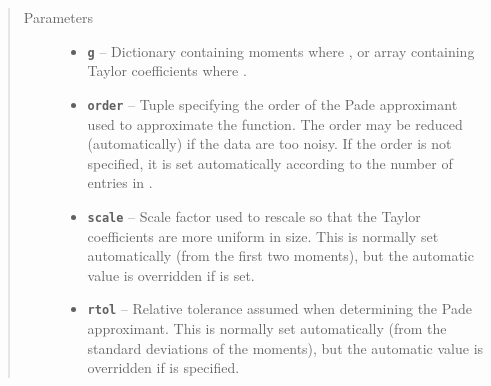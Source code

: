 \documentclass[letterpaper,10pt,english]{sphinxmanual}
\begin{document}
\begin{fulllineitems}
\begin{itemize}
\begin{description}
\end{description}

\end{itemize}
\begin{quote}\begin{description}
\item[{Parameters}] \leavevmode\begin{itemize}
\item {} 
\textbf{\texttt{g}} -- Dictionary containing moments where ,
or array containing Taylor coefficients where
.

\item {} 
\textbf{\texttt{order}} -- Tuple  specifying the order of the Pade
approximant used to approximate the function. The order may
be reduced (automatically) if the data are too noisy.
If the order is not specified, it is set automatically
according to the number of entries in .

\item {} 
\textbf{\texttt{scale}} -- Scale factor used to rescale  so that
the Taylor coefficients are more uniform in size. This is
normally set automatically (from the first two moments),
but the automatic value is overridden if  is set.

\item {} 
\textbf{\texttt{rtol}} -- Relative tolerance assumed when determining the
Pade approximant. This is normally set automatically
(from the standard deviations of the moments), but the
automatic value is overridden if  is specified.

\end{itemize}

\end{description}\end{quote}

\end{fulllineitems}

\end{document}
